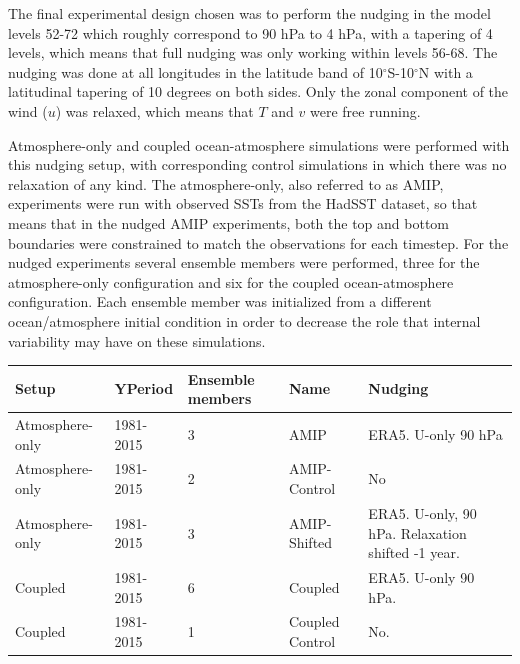
The final experimental design chosen was to perform the nudging in the model levels 52-72 which roughly correspond to 90 hPa to 4 hPa, with a tapering of 4 levels, which means that full nudging was only working within levels 56-68. The nudging was done at all longitudes in the latitude band of 10$^\circ$S-10$^\circ$N with a latitudinal tapering of 10 degrees on both sides. Only the zonal component of the wind ($u$) was relaxed, which means that $T$ and $v$ were free running. 


Atmosphere-only and coupled ocean-atmosphere simulations were performed with this nudging setup, with corresponding control simulations in which there was no relaxation of any kind. The atmosphere-only, also referred to as AMIP, experiments were run with observed SSTs from the HadSST dataset, so that means that in the nudged AMIP experiments, both the top and bottom boundaries were constrained to match the observations for each timestep. 
For the nudged experiments several ensemble members were performed, three for the atmosphere-only configuration and six for the coupled ocean-atmosphere configuration. Each ensemble member was initialized from a different ocean/atmosphere initial condition in order to decrease the role that internal variability may have on these simulations. 

\begin{table}[t!]
\begin{tabular}{p{2.3cm}|p{2.3cm}|p{1.73cm}|p{3cm}|p{5cm}}
Setup           & YPeriod    & Ensemble members & Name            & Nudging                                          \\ \hline \hline
Atmosphere-only & 1981-2015 & 3                & AMIP            & ERA5. U-only 90 hPa                              \\
Atmosphere-only & 1981-2015 & 2                & AMIP-Control    & No                                               \\
Atmosphere-only & 1981-2015 & 3                & AMIP-Shifted    & ERA5. U-only, 90 hPa. Relaxation shifted -1 year. \\
Coupled         & 1981-2015 & 6                & Coupled         & ERA5. U-only 90 hPa.                             \\
Coupled         & 1981-2015 & 1                & Coupled Control & No.                                             
\end{tabular}
\end{table}

